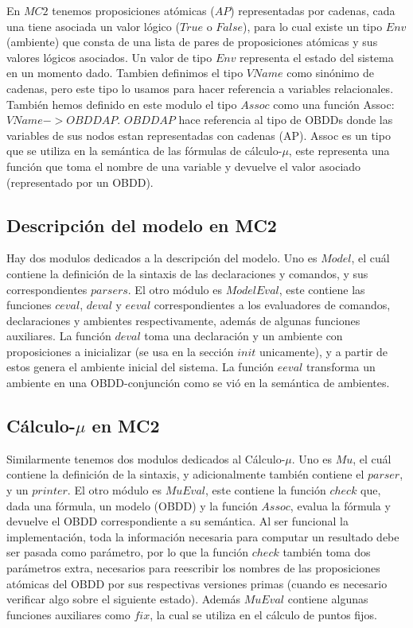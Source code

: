 En $MC2$ tenemos proposiciones atómicas ($AP$) representadas por cadenas, cada una tiene asociada un valor lógico ($True$ o $False$), para lo cual existe un tipo $Env$ (ambiente) que consta de una lista de pares de proposiciones atómicas y sus valores lógicos asociados. Un valor de tipo $Env$ representa el estado del sistema en un momento dado. Tambien definimos el tipo $VName$ como sinónimo de cadenas, pero este tipo lo usamos para hacer referencia a variables relacionales. También hemos definido en este modulo el tipo $Assoc$ como una función Assoc: $VName -> OBDD AP$. $OBDD AP$ hace referencia al tipo de OBDDs donde las variables de sus nodos estan representadas con cadenas (AP). Assoc es un tipo que se utiliza en la semántica de las fórmulas de cálculo-$\mu$, este representa una función que toma el nombre de una variable y devuelve el valor asociado (representado por un OBDD).

\subsection{Descripción del modelo en MC2}

Hay dos modulos dedicados a la descripción del modelo. Uno es $Model$, el cuál contiene la definición de la sintaxis de las declaraciones y comandos, y  sus correspondientes $parsers$. El otro módulo es $ModelEval$, este contiene las funciones $ceval$, $deval$ y $eeval$ correspondientes a los evaluadores de comandos, declaraciones y ambientes respectivamente, además de algunas funciones auxiliares. La función $deval$ toma una declaración y un ambiente con proposiciones a inicializar (se usa en la sección $init$ unicamente), y a partir de estos genera el ambiente inicial del sistema. La función $eeval$ transforma un ambiente en una OBDD-conjunción como se vió en la semántica de ambientes.

\subsection{Cálculo-$\mu$ en MC2}

Similarmente tenemos dos modulos dedicados al Cálculo-$\mu$. Uno es $Mu$, el cuál contiene la definición de la sintaxis, y adicionalmente también contiene el $parser$, y un $printer$. El otro módulo es $MuEval$, este contiene la función $check$ que, dada una fórmula, un modelo (OBDD) y la función $Assoc$, evalua la fórmula y devuelve el OBDD correspondiente a su semántica. Al ser funcional la implementación, toda la información necesaria para computar un resultado debe ser pasada como parámetro, por lo que la función $check$ también toma dos parámetros extra, necesarios para reescribir los nombres de las proposiciones atómicas del OBDD por sus respectivas versiones primas (cuando es necesario verificar algo sobre el siguiente estado). Además $MuEval$ contiene algunas funciones auxiliares como $fix$, la cual se utiliza en el cálculo de puntos fijos.

